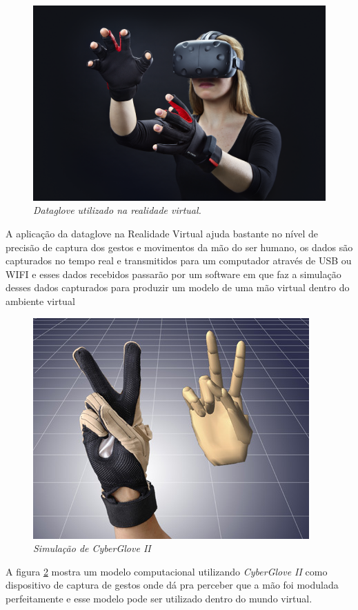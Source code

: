 \documentclass[12pt]{article}
\begin{document}
\begin{figure}[H]
    \centering
    \includegraphics[width=.7\textwidth]{images/ManusVR_Glove_moodfoto2-1024x683.png}
    \caption{\textit{Dataglove utilizado na realidade virtual.}}
    \label{fig:ManusVR}
\end{figure}

A aplicação da dataglove na Realidade Virtual ajuda bastante no nível de precisão de captura dos gestos e movimentos da mão do ser humano, os dados são capturados no tempo real e transmitidos para um computador através de USB ou WIFI e esses dados recebidos passarão por um software em que faz a simulação desses dados capturados para produzir um modelo de uma mão virtual dentro do ambiente virtual \cite{Tham_2018}

\begin{figure}[H]
    \centering
    \includegraphics[width=.7\textwidth]{images/cyberglove2.jpg}
    \caption{\textit{Simulação de CyberGlove II}}
    \label{fig:cyberglove2}
\end{figure}

A figura \ref{fig:cyberglove2} mostra um modelo computacional utilizando \textit{CyberGlove II} como dispositivo de captura de gestos onde dá pra perceber que a mão foi modulada perfeitamente e esse modelo pode ser utilizado dentro do mundo virtual.
\end{document}
